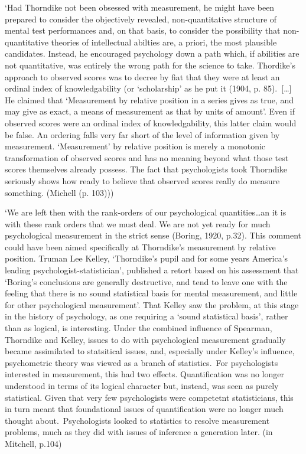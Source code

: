 \documentclass[utf8]{FrontiersinVancouver}
\begin{document}
    `Had Thorndike not been obsessed with measurement, he might have been prepared to consider the objectively revealed, non-quantitative structure of mental test performances and, on that basis, to consider the possibility that non-quantitative theories of intellectual abilties are, a priori, the most plausible candidates. Instead, he encouraged psychology down a path which, if abilities are not quantitative, was entirely the wrong path for the science to take. Thordike's approach to observed scores was to decree by fiat that they were at least an ordinal index of knowledgability (or `scholarship' as he put it (1904, p. 85).\ [\ldots] He claimed that `Measurement by relative position in a series gives as true, and may give as exact, a means of measurement as that by units of amount'. Even if observed scores were an ordinal index of knowledgability, this latter claim would be false. An ordering falls very far short of the level of information given by measurement. `Measurement' by relative position is merely a monotonic transformation of observed scores and has no meaning beyond what those test scores themselves already possess. The fact that psychologists took Thorndike seriously shows how ready to believe that observed scores really do measure something. (Michell (p. 103)))

    `We are left then with the rank-orders of our psychological quantities\ldots an it is with these rank orders that we must deal. We are not yet ready for much psychological measurement in the strict sense (Boring, 1920, p.32). This comment could have been aimed specifically at Thorndike's measurement by relative position. Truman Lee Kelley, `Thorndike's pupil and for some years America's leading psychologist-statistician', published a retort based on his assessment that `Boring's conclusions are generally destructive, and tend to leave one with the feeling that there is no sound statistical basis for mental measurement, and little for other psychological measurement'. That Kelley saw the problem, at this stage in the history of psychology, as one requiring a `sound statistical basis', rather than as logical, is interesting. Under the combined influence of Spearman, Thorndike and Kelley, issues to do with psychological measurement gradually became assimilated to statsitical issues, and, especially under Kelley's influence, psychometric theory was viewed as a branch of statistics.\ For psychologists interested in measurement, this had two effects. Quantification was no longer understood in terms of its logical character but, instead, was seen as purely statistical. Given that very few psychologists were competetnt statisticians, this in turn meant that foundational issues of quantification were no longer much thought about.\ Psychologists looked to statistics to resolve measurement problems, much as they did with issues of inference a generation later. (in Mitchell, p.104)
\end{document}
